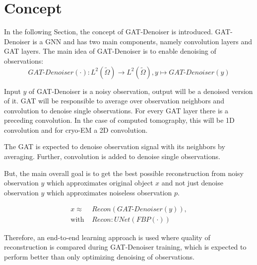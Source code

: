 \section{Concept}
\label{sec:concept}


In the following Section, the concept of GAT-Denoiser is introduced. 
GAT-Denoiser is a GNN and has two main components, namely convolution layers and GAT layers.
The main idea of GAT-Denoiser is to enable denoising of observations:
\begin{equation}
  \textit{GAT-Denoiser} (\cdot) : L^2(\tilde{\Omega}) \to  L^2(\tilde{\Omega}) , y \mapsto \textit{GAT-Denoiser} (y) 
\end{equation}


Input $y$ of GAT-Denoiser is a noisy observation, output will be a denoised version of it.
GAT will be responsible to average over observation neighbors and convolution to denoise single observations. 
For every GAT layer there is a preceding convolution. 
In the case of computed tomography, this will be 1D convolution and for cryo-EM a 2D convolution.

\begin{tcolorbox}[colback=red!5!white,colframe=red!75!black]
  The GAT is expected to denoise observation signal with its neighbors by averaging. 
  Further, convolution is added to denoise single observations.
\end{tcolorbox}


But, the main overall goal is to get the best possible reconstruction 
from noisy observation $y$ which approximates original object $x$ and 
not just denoise observation $y$ which approximates noiseless observation $p$.


\begin{equation}
  \begin{aligned}
    x \approx   &\textit{Recon} \left( \textit{GAT-Denoiser} \left( y \right) \right), \\
    \text{with } &\textit{Recon} : \textit{UNet} \left( \textit{FBP} \left( \cdot \right) \right)  
  \end{aligned}
\end{equation}

Therefore, an end-to-end learning approach is used where quality of reconstruction is 
compared during GAT-Denoiser training, which is expected to perform better than 
only optimizing denoising of observations.

